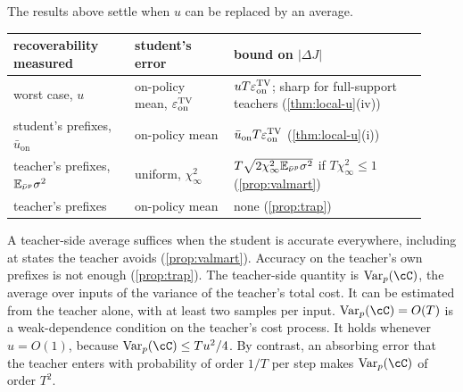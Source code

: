 \begin{remark}\label{rem:where-avg}
The results above settle when $u$ can be replaced by an average.
\begin{center}\small
\begin{tabular}{@{}>{\raggedright\arraybackslash}p{0.27\linewidth}>{\raggedright\arraybackslash}p{0.22\linewidth}>{\raggedright\arraybackslash}p{0.43\linewidth}@{}}
\toprule
recoverability measured & student's error & bound on $|\Delta J|$\\\midrule
worst case, $u$ & on-policy mean, $\varepsilon_{\mathrm{on}}^{\mathrm{TV}}$ & $uT\varepsilon_{\mathrm{on}}^{\mathrm{TV}}$; sharp for full-support teachers (\cref{thm:local-u}(iv))\\
student's prefixes, $\bar u_{\mathrm{on}}$ & on-policy mean & $\bar u_{\mathrm{on}}T\varepsilon_{\mathrm{on}}^{\mathrm{TV}}$ (\cref{thm:local-u}(i))\\
teacher's prefixes, $\mathbb{E}_{\bar\nu^p}\sigma^2$ & uniform, $\chi^2_\infty$ & $T\sqrt{2\chi^2_\infty\mathbb{E}_{\bar\nu^p}\sigma^2}$ if $T\chi^2_\infty\le1$ (\cref{prop:valmart})\\
teacher's prefixes & on-policy mean & none (\cref{prop:trap})\\\bottomrule
\end{tabular}
\end{center}
A teacher-side average suffices when the student is accurate everywhere, including at states the teacher
avoids (\cref{prop:valmart}). Accuracy on the teacher's own prefixes is not enough (\cref{prop:trap}). The
teacher-side quantity is $\Var_p(\cC)$, the average over inputs of the variance of the teacher's total cost. It can
be estimated from the teacher alone, with at least two samples per input. $\Var_p(\cC)=O(T)$ is a
weak-dependence condition on the teacher's cost process. It holds whenever $u=O(1)$, because
$\Var_p(\cC)\le Tu^2/4$. By contrast, an absorbing error that the teacher enters with probability of order $1/T$ per
step makes $\Var_p(\cC)$ of order $T^2$.
\end{remark}

